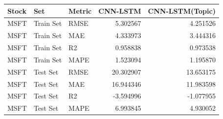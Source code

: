 \begin{tabular}{lllrr}
\toprule
Stock & Set & Metric & CNN-LSTM & CNN-LSTM(Topic) \\
\midrule
MSFT & Train Set & RMSE & 5.302567 & 4.251526 \\
MSFT & Train Set & MAE & 4.333973 & 3.444316 \\
MSFT & Train Set & R2 & 0.958838 & 0.973538 \\
MSFT & Train Set & MAPE & 1.523094 & 1.195870 \\
MSFT & Test Set & RMSE & 20.302907 & 13.653175 \\
MSFT & Test Set & MAE & 16.944346 & 11.983598 \\
MSFT & Test Set & R2 & -3.594996 & -1.077955 \\
MSFT & Test Set & MAPE & 6.993845 & 4.930052 \\
\bottomrule
\end{tabular}
